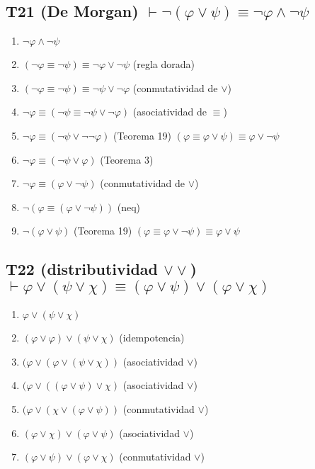 \documentclass[a4paper,11pt]{article}
\begin{document}
\subsection{T21 (De Morgan) $\vdash \neg(\varphi \lor \psi) \equiv \neg\varphi \land \neg\psi$}

\begin{enumerate}
    \item $\neg\varphi \land \neg\psi$
    \item $(\neg\varphi \equiv \neg\psi) \equiv \neg\varphi \lor \neg\psi$ \hfill (regla dorada)
    \item $(\neg\varphi \equiv \neg\psi) \equiv \neg\psi \lor \neg\varphi$ \hfill (conmutatividad de $\lor$)
    \item $\neg\varphi \equiv (\neg\psi \equiv \neg\psi \lor \neg\varphi)$ \hfill (asociatividad de $\equiv$)
    \item $\neg\varphi \equiv (\neg\psi \lor \neg\neg\varphi)$ \hfill (Teorema 19) $(\varphi \equiv \varphi \lor \psi) \equiv \varphi \lor \neg\psi$
    \item $\neg\varphi \equiv (\neg\psi \lor \varphi)$ \hfill (Teorema 3)
    \item $\neg\varphi \equiv (\varphi \lor \neg\psi)$ \hfill (conmutatividad de $\lor$)
    \item $\neg(\varphi \equiv (\varphi \lor \neg\psi))$ \hfill (neq)
    \item $\neg(\varphi \lor \psi)$ \hfill (Teorema 19) $(\varphi \equiv \varphi \lor \neg\psi) \equiv \varphi \lor \psi$

\end{enumerate}

\subsection{T22 (distributividad $\lor\lor$) $\vdash \varphi \lor (\psi \lor \chi) \equiv (\varphi \lor \psi) \lor (\varphi \lor \chi)$}

\begin{enumerate}
    \item $\varphi \lor (\psi \lor \chi)$
    \item $(\varphi \lor \varphi) \lor (\psi \lor \chi)$ \hfill (idempotencia)
    \item $(\varphi \lor (\varphi \lor (\psi \lor \chi))$ \hfill (asociatividad $\lor$)
    \item $(\varphi \lor ((\varphi \lor \psi) \lor \chi)$ \hfill (asociatividad $\lor$)
    \item $(\varphi \lor (\chi \lor (\varphi \lor \psi))$ \hfill (conmutatividad $\lor$)
    \item $(\varphi \lor \chi) \lor (\varphi \lor \psi)$ \hfill (asociatividad $\lor$)
    \item $(\varphi \lor \psi) \lor (\varphi \lor \chi)$ \hfill (conmutatividad $\lor$)

\end{enumerate}
\end{document}
